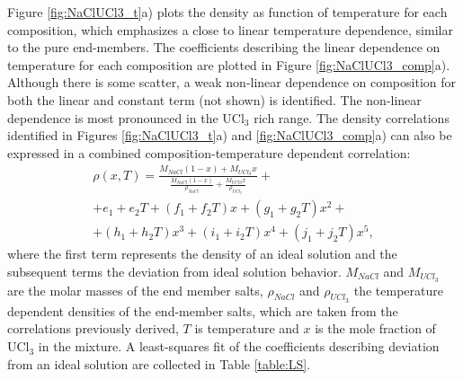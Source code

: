 \documentclass[preprint,3p,10pt,onecolumn,number,sort&compress]{elsarticle}
\begin{document}

Figure \ref{fig:NaClUCl3_t}a) plots the density as function of temperature for each composition, which emphasizes a close to linear temperature dependence, similar to the pure end-members. %
The coefficients describing the linear dependence on temperature for each composition are plotted in Figure \ref{fig:NaClUCl3_comp}a). Although there is some scatter, a weak non-linear dependence on composition for both the linear and constant term (not shown) is identified. The non-linear dependence is most pronounced in the UCl$_3$ rich range.  
The density correlations identified in Figures \ref{fig:NaClUCl3_t}a) and \ref{fig:NaClUCl3_comp}a) can also be expressed in a combined composition-temperature dependent correlation:
\begin{equation}
\begin{split}
\rho(x,T)=\frac{M_{NaCl}(1-x)+M_{UCl_3}x}{\frac{M_{NaCl}(1-x)}{\rho_{NaCl}} +\frac{M_{UCl3}x}{\rho_{UCl_3}}}+\\
+e_1+e_2T+(f_1+f_2T)x+(g_1+g_2T)x^2+\\
+(h_1+h_2T)x^3+(i_1+i_2T)x^4+(j_1+j_2T)x^5,
\label{eq:LS}
\end{split}
\end{equation}
where the first term represents the density of an ideal solution and the subsequent terms the deviation from ideal solution behavior. $M_{NaCl}$ and $M_{UCl_3}$ are the molar masses of the end member salts, $\rho_{NaCl}$ and $\rho_{UCl_3}$ the temperature dependent densities of the end-member salts, which are taken from the correlations previously derived, $T$ is temperature and $x$ is the mole fraction of UCl$_3$ in the mixture. A least-squares fit of the coefficients describing deviation from an ideal solution are collected in Table \ref{table:LS}.
\end{document}

